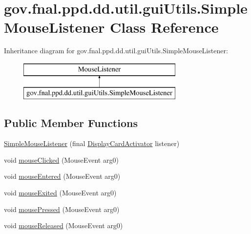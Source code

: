 \hypertarget{classgov_1_1fnal_1_1ppd_1_1dd_1_1util_1_1guiUtils_1_1SimpleMouseListener}{\section{gov.\-fnal.\-ppd.\-dd.\-util.\-gui\-Utils.\-Simple\-Mouse\-Listener Class Reference}
\label{classgov_1_1fnal_1_1ppd_1_1dd_1_1util_1_1guiUtils_1_1SimpleMouseListener}
}
Inheritance diagram for gov.\-fnal.\-ppd.\-dd.\-util.\-gui\-Utils.\-Simple\-Mouse\-Listener\-:\begin{figure}[H]
\begin{center}
\leavevmode
\includegraphics[height=2.000000cm]{classgov_1_1fnal_1_1ppd_1_1dd_1_1util_1_1guiUtils_1_1SimpleMouseListener}
\end{center}
\end{figure}
\subsection*{Public Member Functions}
\begin{DoxyCompactItemize}
\item 
\hyperlink{classgov_1_1fnal_1_1ppd_1_1dd_1_1util_1_1guiUtils_1_1SimpleMouseListener_ae74e535554d7fe67ed5472763951a0e7}{Simple\-Mouse\-Listener} (final \hyperlink{interfacegov_1_1fnal_1_1ppd_1_1dd_1_1interfaces_1_1DisplayCardActivator}{Display\-Card\-Activator} listener)
\item 
void \hyperlink{classgov_1_1fnal_1_1ppd_1_1dd_1_1util_1_1guiUtils_1_1SimpleMouseListener_aa76141289b9f3e521de172503a5f128d}{mouse\-Clicked} (Mouse\-Event arg0)
\item 
void \hyperlink{classgov_1_1fnal_1_1ppd_1_1dd_1_1util_1_1guiUtils_1_1SimpleMouseListener_ade694da70bdd7c1edc8c8a327bd6be48}{mouse\-Entered} (Mouse\-Event arg0)
\item 
void \hyperlink{classgov_1_1fnal_1_1ppd_1_1dd_1_1util_1_1guiUtils_1_1SimpleMouseListener_ab1d5b6a13257070a33237e5a1379316b}{mouse\-Exited} (Mouse\-Event arg0)
\item 
void \hyperlink{classgov_1_1fnal_1_1ppd_1_1dd_1_1util_1_1guiUtils_1_1SimpleMouseListener_aff7c5e69f11df77bd68575e5528210d4}{mouse\-Pressed} (Mouse\-Event arg0)
\item 
void \hyperlink{classgov_1_1fnal_1_1ppd_1_1dd_1_1util_1_1guiUtils_1_1SimpleMouseListener_a824c6af8dba5ab9eed10fdc4daba29b5}{mouse\-Released} (Mouse\-Event arg0)
\end{DoxyCompactItemize}


